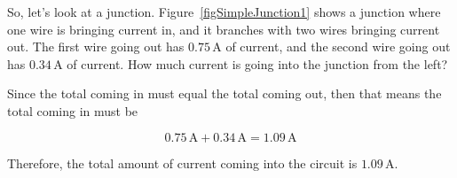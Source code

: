 So, let's look at a junction.
Figure~\ref{figSimpleJunction1} shows a junction where one wire is bringing current in, and it branches with two wires bringing current out.  
The first wire going out has $0.75\,\si{\ampere}$ of current, and the second wire going out has $0.34\,\si{\ampere}$ of current.
How much current is going into the junction from the left?


Since the total coming in must equal the total coming out, then that means the total coming in must be 

$$0.75\,\si{\ampere} + 0.34\,\si{\ampere} = 1.09\,\si{\ampere}$$

Therefore, the total amount of current coming into the circuit is $1.09\,\si{\ampere}$.

